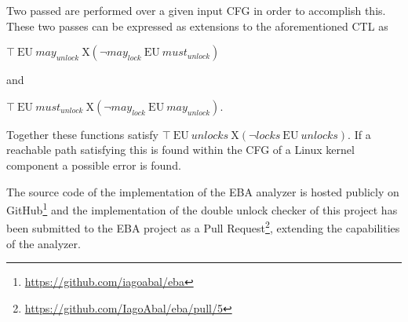 \newpar Two passed are performed over a given input CFG in order to accomplish this. These two passes can be expressed as extensions to the aforementioned CTL as 
\begin{center}
    $\top\:\mathrm{EU}\:may_{unlock}\:\mathrm{X}(\neg may_{lock} \:\mathrm{EU}\:must_{unlock})$ 

    and 

    $\top\:\mathrm{EU}\:must_{unlock}\:\mathrm{X}(\neg may_{lock} \:\mathrm{EU}\:may_{unlock})$. 
\end{center}

\newpar Together these functions satisfy $\top\:\mathrm{EU}\:unlocks\:\mathrm{X}(\neg locks\:\mathrm{EU}\:unlocks)$. If a reachable path satisfying this is found within the CFG of a Linux kernel component a possible error is found.

\newpar The source code of the implementation of the EBA analyzer is hosted publicly  on GitHub\footnote{\url{https://github.com/iagoabal/eba}} and the implementation of the double unlock checker of this project has been submitted to the EBA project as a Pull Request\footnote{\url{https://github.com/IagoAbal/eba/pull/5}}, extending the capabilities of the analyzer. 